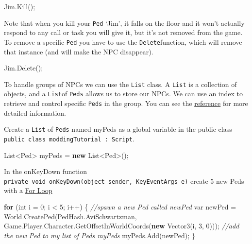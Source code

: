 \documentclass[
  openany]{book}
\newenvironment{Shaded}{\begin{snugshade}}{\end{snugshade}}
\newcommand{\CommentTok}[1]{\textcolor[rgb]{0.56,0.35,0.01}{\textit{#1}}}
\newcommand{\DataTypeTok}[1]{\textcolor[rgb]{0.13,0.29,0.53}{#1}}
\newcommand{\DecValTok}[1]{\textcolor[rgb]{0.00,0.00,0.81}{#1}}
\newcommand{\FunctionTok}[1]{\textcolor[rgb]{0.00,0.00,0.00}{#1}}
\newcommand{\KeywordTok}[1]{\textcolor[rgb]{0.13,0.29,0.53}{\textbf{#1}}}
\newcommand{\NormalTok}[1]{#1}
\begin{document}
\begin{Shaded}
\begin{Highlighting}[]
\NormalTok{Jim.}\FunctionTok{Kill}\NormalTok{();}
\end{Highlighting}
\end{Shaded}

Note that when you kill your \texttt{Ped} `Jim', it falls on the floor and it won't actually respond to any call or task you will give it, but it's not removed from the game. To remove a specific \texttt{Ped} you have to use the \texttt{Delete}function, which will remove that instance (and will make the NPC disappear).

\begin{Shaded}
\begin{Highlighting}[]
\NormalTok{Jim.}\FunctionTok{Delete}\NormalTok{();}
\end{Highlighting}
\end{Shaded}

To handle groups of NPCs we can use the \texttt{List} class. A \texttt{List} is a collection of objects, and a \texttt{List}of \texttt{Peds} allows us to store our NPCs. We can use an index to retrieve and control specific \texttt{Peds} in the group. You can see the \href{https://learn.microsoft.com/en-us/dotnet/api/system.collections.generic.list-1?view=net-7.0}{reference} for more detailed information.

Create a \texttt{List} of \texttt{Peds} named myPeds as a global variable in the public class \texttt{public\ class\ moddingTutorial\ :\ Script}.

\begin{Shaded}
\begin{Highlighting}[]
\NormalTok{List<Ped> myPeds = }\KeywordTok{new}\NormalTok{ List<Ped>();}
\end{Highlighting}
\end{Shaded}

In the onKeyDown function \texttt{private\ void\ onKeyDown(object\ sender,\ KeyEventArgs\ e)} create 5 new Peds with a \href{https://www.w3schools.com/cs/cs_for_loop.php}{For Loop}

\begin{Shaded}
\begin{Highlighting}[]
\KeywordTok{for}\NormalTok{ (}\DataTypeTok{int}\NormalTok{ i = }\DecValTok{0}\NormalTok{; i < }\DecValTok{5}\NormalTok{; i++)}
\NormalTok{\{}
    \CommentTok{//spawn a new Ped called newPed}
    \DataTypeTok{var}\NormalTok{ newPed = World.}\FunctionTok{CreatePed}\NormalTok{(PedHash.}\FunctionTok{AviSchwartzman}\NormalTok{, Game.}\FunctionTok{Player}\NormalTok{.}\FunctionTok{Character}\NormalTok{.}\FunctionTok{GetOffsetInWorldCoords}\NormalTok{(}\KeywordTok{new} \FunctionTok{Vector3}\NormalTok{(i, }\DecValTok{3}\NormalTok{, }\DecValTok{0}\NormalTok{)));}
    \CommentTok{//add the new Ped to my list of Peds myPeds}
\NormalTok{    myPeds.}\FunctionTok{Add}\NormalTok{(newPed);}
\NormalTok{\}}
\end{Highlighting}
\end{Shaded}
\end{document}
